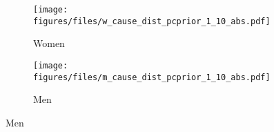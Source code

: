 \begin{figure}[htp]
\caption{Posterior Distribution $exp(\beta_{\text{Mob}})$ and $exp(\beta{\text{Gini}})$ \newline by Cause of Death and Gender}
\centering

  \begin{subfigure}[b]{.80\linewidth}
    \centering
       \caption{Women}
    \texttt{[image: figures/files/w\_cause\_dist\_pcprior\_1\_10\_abs.pdf]}
  \end{subfigure}%

 \begin{subfigure}[b]{.80\linewidth}
   \caption{Men}
    \centering
    \texttt{[image: figures/files/m\_cause\_dist\_pcprior\_1\_10\_abs.pdf]}
  \end{subfigure}%
  \label{fig:cause_of_death_abs}
\end{figure}
